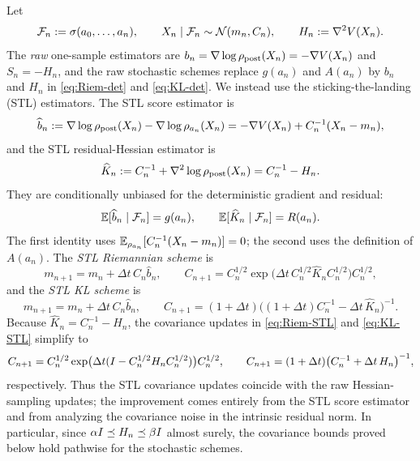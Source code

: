 Let
\[
    \mathcal{F}_n:=\sigma(a_0,\ldots,a_n),
    \qquad
    X_n\mid\mathcal{F}_n\sim\mathcal{N}(m_n,C_n),
    \qquad
    H_n:=\nabla^2V(X_n).
\]
The \emph{raw} one-sample estimators are
$b_n=\nabla\log\rho_{\mathrm{post}}(X_n)=-\nabla V(X_n)$ and $S_n=-H_n$, and the raw stochastic
schemes replace $g(a_n)$ and $A(a_n)$ by $b_n$ and $H_n$ in \eqref{eq:Riem-det} and
\eqref{eq:KL-det}. We instead use the sticking-the-landing (STL) estimators. The STL
score estimator is
\begin{equation}
\label{eq:STL-score}
    \widehat b_n
    :=
    \nabla\log\rho_{\mathrm{post}}(X_n)-\nabla\log\rho_{a_n}(X_n)
    =
    -\nabla V(X_n)+C_n^{-1}(X_n-m_n),
\end{equation}
and the STL residual-Hessian estimator is
\begin{equation}
\label{eq:STL-residual}
    \widehat K_n
    :=
    C_n^{-1}+\nabla^2\log\rho_{\mathrm{post}}(X_n)
    =
    C_n^{-1}-H_n.
\end{equation}
They are conditionally unbiased for the deterministic gradient and residual:
\begin{equation}
\label{eq:STL-unbiased}
    \mathbb{E}[\widehat b_n\mid\mathcal{F}_n]=g(a_n),
    \qquad
    \mathbb{E}[\widehat K_n\mid\mathcal{F}_n]=R(a_n).
\end{equation}
The first identity uses $\mathbb{E}_{\rho_{a_n}}[C_n^{-1}(X_n-m_n)]=0$; the second uses the
definition of $A(a_n)$. The \emph{STL Riemannian scheme} is
\begin{equation}
\label{eq:Riem-STL}
    m_{n+1}=m_n+\Delta t\,C_n\widehat b_n,
    \qquad
    C_{n+1}
    =
    C_n^{1/2}\exp\bigl(\Delta t\,C_n^{1/2}\widehat K_nC_n^{1/2}\bigr)C_n^{1/2},
\end{equation}
and the \emph{STL KL scheme} is
\begin{equation}
\label{eq:KL-STL}
    m_{n+1}=m_n+\Delta t\,C_n\widehat b_n,
    \qquad
    C_{n+1}
    =
    (1+\Delta t)\bigl((1+\Delta t)C_n^{-1}-\Delta t\,\widehat K_n\bigr)^{-1}.
\end{equation}
Because $\widehat K_n=C_n^{-1}-H_n$, the covariance updates in \eqref{eq:Riem-STL} and
\eqref{eq:KL-STL} simplify to
\begin{equation}
\label{eq:STL-cov-simplify}
    C_{n+1}
    =
    C_n^{1/2}\exp\bigl(\Delta t(I-C_n^{1/2}H_nC_n^{1/2})\bigr)C_n^{1/2},
    \qquad
    C_{n+1}
    =
    (1+\Delta t)\bigl(C_n^{-1}+\Delta t\,H_n\bigr)^{-1},
\end{equation}
respectively. Thus the STL covariance updates coincide with the raw Hessian-sampling
updates; the improvement comes entirely from the STL score estimator and from analyzing
the covariance noise in the intrinsic residual norm. In particular, since
$\alpha I\preceq H_n\preceq\beta I$ almost surely, the covariance bounds proved below
hold pathwise for the stochastic schemes.

